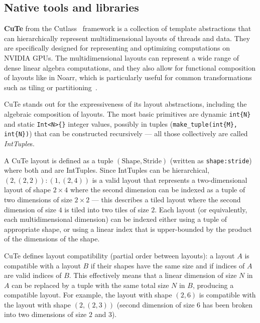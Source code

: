 \subsection{Native tools and libraries}\label{sec:native-tools}

\textbf{CuTe} from the Cutlass~\cite{thakkar2023cutlass} framework is a collection of \cpp template abstractions that can hierarchically represent multidimensional layouts of threads and data. They are specifically designed for representing and optimizing computations on NVIDIA GPUs\@. The multidimensional layouts can represent a wide range of dense linear algebra computations, and they also allow for functional composition of layouts like in Noarr\@, which is particularly useful for common transformations such as tiling or partitioning~\cite{nvidia-cute}.

CuTe stands out for the expressiveness of its layout abstractions, including the algebraic composition of layouts. The most basic primitives are dynamic \lstinline|int{N}| and static \lstinline|Int<N>{}| integer values, possibly in tuples (\lstinline|make_tuple(int{M}, int{N})|) that can be constructed recursively --- all those collectively are called \emph{IntTuple}s.

A CuTe layout is defined as a tuple $(\text{Shape}, \text{Stride})$ (written as \lstinline{shape:stride}) where both  and  are IntTuples. Since IntTuples can be hierarchical, $(2, (2, 2)) : (1, (2, 4))$ is a valid layout that represents a two-dimensional layout of shape $2 \times 4$ where the second dimension can be indexed as a tuple of two dimensions of size $2 \times 2$ --- this describes a tiled layout where the second dimension of size $4$ is tiled into two tiles of size $2$. Each layout (or equivalently, each multidimensional dimension) can be indexed either using a tuple of appropriate shape, or using a linear index that is upper-bounded by the product of the dimensions of the shape.

CuTe defines layout compatibility (partial order between layouts): a layout $A$ is compatible with a layout $B$ if their shapes have the same size and if indices of $A$ are valid indices of $B$. This effectively means that a linear dimension of size $N$ in $A$ can be replaced by a tuple with the same total size $N$ in $B$, producing a compatible layout. For example, the layout with shape $(2, 6)$ is compatible with the layout with shape $(2, (2, 3))$ (second dimension of size $6$ has been broken into two dimensions of size $2$ and $3$).

